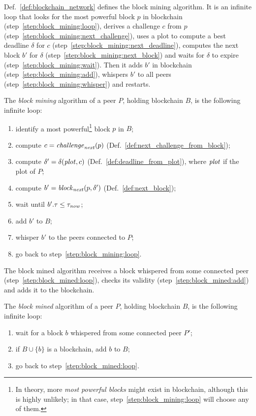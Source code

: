Def.~\ref{def:blockchain_network} defines the
block mining algorithm. It is an infinite loop that
looks for the most powerful block $p$ in blockchain (step~\ref{step:block_mining:loop}),
derives a challenge $c$ from $p$ (step~\ref{step:block_mining:next_challenge}),
uses a plot to compute a best deadline $\delta$ for $c$ (step~\ref{step:block_mining:next_deadline}),
computes the next block $b'$ for $\delta$ (step~\ref{step:block_mining:next_block}) and waits for $\delta$
to expire (step~\ref{step:block_mining:wait}). Then it adds $b'$ in blockchain
(step~\ref{step:block_mining:add}), whispers $b'$ to all peers (step~\ref{step:block_mining:whisper})
and restarts.
%
\begin{alg}\label{alg:block_mining}
  The \emph{block mining} algorithm of a peer $P$, holding blockchain $B$,
  is the following infinite loop:
  \begin{enumerate}
  \item\label{step:block_mining:loop} identify a most powerful\footnote{In theory, more \emph{most powerful blocks} might exist in blockchain, although this is highly unlikely; in that case, step~\ref{step:block_mining:loop} will choose any of them.} block $p$ in $B$;
  \item\label{step:block_mining:next_challenge} compute $c={\mathit{challenge}}_{\mathit{next}}(p)$ (Def.~\ref{def:next_challenge_from_block});
  \item\label{step:block_mining:next_deadline} compute $\delta'=\delta({\mathit{plot}},c)$ (Def.~\ref{def:deadline_from_plot}), where ${\mathit{plot}}$
    if the plot of $P$;
  \item\label{step:block_mining:next_block} compute $b'={\mathit{block}}_{\mathit{next}}(p,\delta')$ (Def.~\ref{def:next_block});
  \item\label{step:block_mining:wait} wait until $b'.\tau\le\tau_{\mathit{now}}$;
  \item\label{step:block_mining:add} add $b'$ to $B$;
  \item\label{step:block_mining:whisper} whisper $b'$ to the peers connected to $P$;
  \item go back to step~\ref{step:block_mining:loop}.
  \end{enumerate}
\end{alg}
%
The block mined algorithm receives a block whispered from some connected peer
(step~\ref{step:block_mined:loop}), checks its validity
(step~\ref{step:block_mined:add}) and adds it to the blockchain.
%
\begin{alg}\label{alg:block_mined}
  The \emph{block mined} algorithm of a peer $P$, holding blockchain $B$,
  is the following infinite loop:
  \begin{enumerate}
  \item\label{step:block_mined:loop} wait for a block $b$ whispered from some connected peer $P'$;
  \item\label{step:block_mined:add} if $B\cup\{b\}$ is a blockchain, add $b$ to $B$;
  \item go back to step~\ref{step:block_mined:loop}.
  \end{enumerate}
\end{alg}
